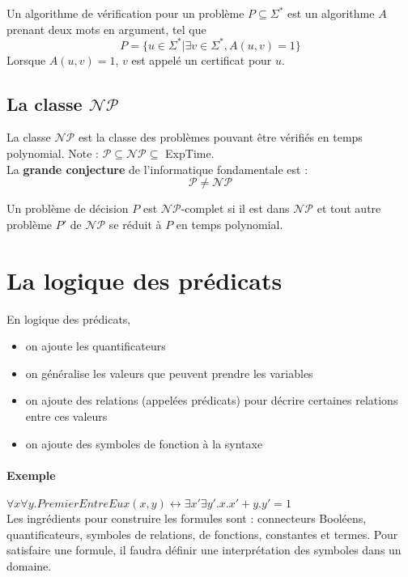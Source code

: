 \documentclass[a4paper]{article}
\begin{document}
  Un algorithme de vérification pour un problème $P \subseteq \Sigma^*$ est un
  algorithme $A$ prenant deux mots en argument, tel que 
  $$ P = \{ u \in \Sigma^* | \exists v \in \Sigma^*, A(u,v) =1 \} $$
  Lorsque $A(u,v) = 1$, $v$ est appelé un certificat pour $u$.

  \subsection{La classe $\mathcal{N}\mathcal{P}$}
  La classe $\mathcal{N}\mathcal{P}$ est la classe des problèmes pouvant être vérifiés
  en temps polynomial. Note : $\mathcal{P} \subseteq \mathcal{N}\mathcal{P} \subseteq$ ExpTime.\\

  La \textbf{grande conjecture} de l'informatique fondamentale est :
  $$ \mathcal{P} \neq \mathcal{N}\mathcal{P} $$

  Un problème de décision $P$ est $\mathcal{N}\mathcal{P}$-complet si il est dans
  $\mathcal{N}\mathcal{P}$ et tout autre problème $P'$ de $\mathcal{N}\mathcal{P}$
  se réduit à $P$ en temps polynomial.


\section{La logique des prédicats}
  En logique des prédicats,
  \begin{itemize}
    \item on ajoute les quantificateurs
    \item on généralise les valeurs que peuvent prendre les variables
    \item on ajoute des relations (appelées prédicats) pour décrire certaines
    relations entre ces valeurs
    \item on ajoute des symboles de fonction à la syntaxe
  \end{itemize}

  \paragraph{Exemple} $\forall x\forall y . PremierEntreEux(x,y) \leftrightarrow \exists x' \exists y' . x.x'+y.y' = 1$\\

  Les ingrédients pour construire les formules sont : connecteurs Booléens,
  quantificateurs, symboles de relations, de fonctions, constantes et termes. Pour
  satisfaire une formule, il faudra définir une interprétation des symboles dans un domaine.
\end{document}
